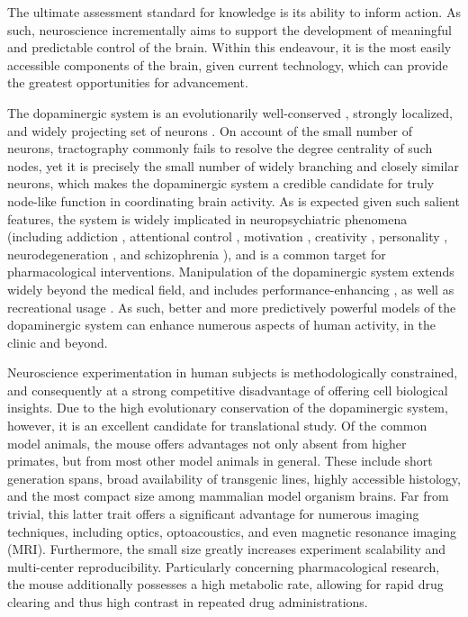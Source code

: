 The ultimate assessment standard for knowledge is its ability to inform action.
As such, neuroscience incrementally aims to support the development of meaningful and predictable control of the brain.
Within this endeavour, it is the most easily accessible components of the brain, given current technology, which can provide the greatest opportunities for advancement.

The dopaminergic system is an evolutionarily well-conserved \cite{Yamamoto2011}, strongly localized, and widely projecting set of neurons \cite{Aransay2015,Fields2007,Ikemoto2007,Hnasko2012}.
On account of the small number of neurons, tractography commonly fails to resolve the degree centrality of such nodes, yet it is precisely the small number of widely branching and closely similar neurons, which makes the dopaminergic system a credible candidate for truly node-like function in coordinating brain activity.
As is expected given such salient features, the system is widely implicated in neuropsychiatric phenomena (including
addiction \cite{DiChiara1988,DiChiara1999},
attentional control \cite{Nieoullon2002},
motivation \cite{Salamone1994},
creativity \cite{Chermahini2010},
personality \cite{Depue1999},
neurodegeneration \cite{Masliah2000},
and schizophrenia \cite{Howes2009}),
and is a common target for pharmacological interventions.
Manipulation of the dopaminergic system extends widely beyond the medical field, and includes performance-enhancing \cite{Mehta2000,Turner2003}, as well as recreational usage \cite{DiChiara1988}.
As such, better and more predictively powerful models of the dopaminergic system can enhance numerous aspects of human activity, in the clinic and beyond.

Neuroscience experimentation in human subjects is methodologically constrained, and consequently at a strong competitive disadvantage of offering cell biological insights.
Due to the high evolutionary conservation of the dopaminergic system, however, it is an excellent candidate for translational study.
Of the common model animals, the mouse offers advantages not only absent from higher primates, but from most other model animals in general.
These include short generation spans, broad availability of transgenic lines, highly accessible histology, and the most compact size among mammalian model organism brains.
Far from trivial, this latter trait offers a significant advantage for numerous imaging techniques, including optics, optoacoustics, and even magnetic resonance imaging (MRI).
Furthermore, the small size greatly increases experiment scalability and multi-center reproducibility.
Particularly concerning pharmacological research, the mouse additionally possesses a high metabolic rate, allowing for rapid drug clearing and thus high contrast in repeated drug administrations.

